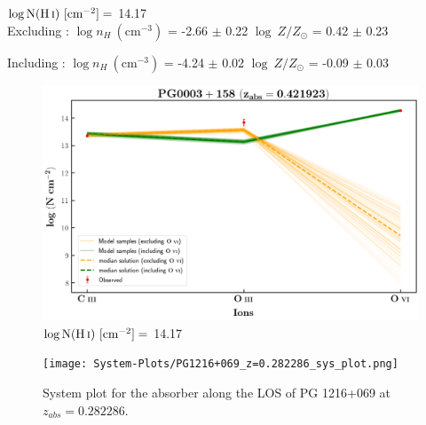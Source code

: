   $\log \text{N}(\ion{H}{i}) \ [\text{cm}^{-2}]=$ 14.17 \\
  
  Excluding  : $\log n_H \ (\text{cm}^{-3})$ = -2.66 $\pm$ 0.22 \hspace{10mm} $\log \ Z/Z_\odot$ = 0.42 $\pm$ 0.23
  
  Including  : $\log n_H \ (\text{cm}^{-3})$ = -4.24 $\pm$ 0.02 \hspace{10mm} $\log \ Z/Z_\odot$ = -0.09 $\pm$ 0.03 \\
  
  \begin{figure}[!h]
    \centering
    \includegraphics[width=0.83\linewidth]{Ionisation-Modelling-Plots/pg0003-z=0.421923-compII.png}
      \caption{$\log \text{N}(\ion{H}{i}) \ [\text{cm}^{-2}]=$ 14.17}
  \end{figure}
  
  
  \newpage
  
  
  \begin{landscape}
  
      \begin{figure}
      \centering
      \vspace{-20mm}
      \hspace*{-35mm}
      \texttt{[image: System-Plots/PG1216+069\_z=0.282286\_sys\_plot.png]}
      \caption{System plot for the absorber along the LOS of PG 1216+069 at $z_{abs} = 0.282286$. }
      \end{figure}
      
  \end{landscape}
  
